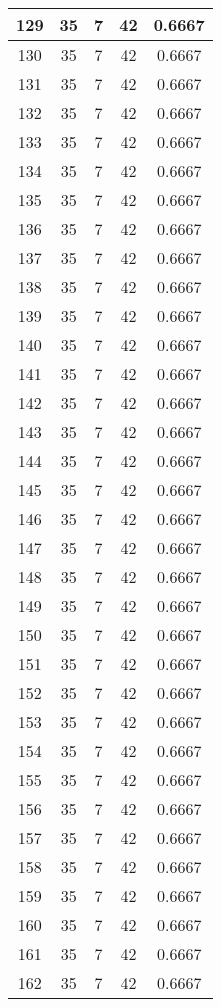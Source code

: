 \documentclass[letterpaper, 12pt]{article}
\begin{document}
\begin{longtable}{|c|c|c|c|c|}
\hline
129 & 35 & 7 & 42 & 0.6667 \\
\hline
130 & 35 & 7 & 42 & 0.6667 \\
\hline
131 & 35 & 7 & 42 & 0.6667 \\
\hline
132 & 35 & 7 & 42 & 0.6667 \\
\hline
133 & 35 & 7 & 42 & 0.6667 \\
\hline
134 & 35 & 7 & 42 & 0.6667 \\
\hline
135 & 35 & 7 & 42 & 0.6667 \\
\hline
136 & 35 & 7 & 42 & 0.6667 \\
\hline
137 & 35 & 7 & 42 & 0.6667 \\
\hline
138 & 35 & 7 & 42 & 0.6667 \\
\hline
139 & 35 & 7 & 42 & 0.6667 \\
\hline
140 & 35 & 7 & 42 & 0.6667 \\
\hline
141 & 35 & 7 & 42 & 0.6667 \\
\hline
142 & 35 & 7 & 42 & 0.6667 \\
\hline
143 & 35 & 7 & 42 & 0.6667 \\
\hline
144 & 35 & 7 & 42 & 0.6667 \\
\hline
145 & 35 & 7 & 42 & 0.6667 \\
\hline
146 & 35 & 7 & 42 & 0.6667 \\
\hline
147 & 35 & 7 & 42 & 0.6667 \\
\hline
148 & 35 & 7 & 42 & 0.6667 \\
\hline
149 & 35 & 7 & 42 & 0.6667 \\
\hline
150 & 35 & 7 & 42 & 0.6667 \\
\hline
151 & 35 & 7 & 42 & 0.6667 \\
\hline
152 & 35 & 7 & 42 & 0.6667 \\
\hline
153 & 35 & 7 & 42 & 0.6667 \\
\hline
154 & 35 & 7 & 42 & 0.6667 \\
\hline
155 & 35 & 7 & 42 & 0.6667 \\
\hline
156 & 35 & 7 & 42 & 0.6667 \\
\hline
157 & 35 & 7 & 42 & 0.6667 \\
\hline
158 & 35 & 7 & 42 & 0.6667 \\
\hline
159 & 35 & 7 & 42 & 0.6667 \\
\hline
160 & 35 & 7 & 42 & 0.6667 \\
\hline
161 & 35 & 7 & 42 & 0.6667 \\
\hline
162 & 35 & 7 & 42 & 0.6667 \\

\end{longtable}
\end{document}
